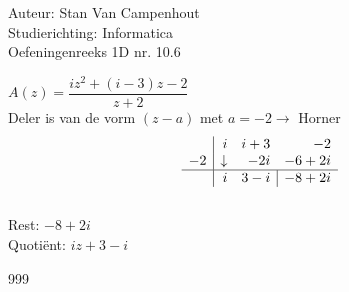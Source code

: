 \documentclass[a4paper]{article}
\begin{document}
  
\noindent \large Auteur: Stan Van Campenhout \\
\noindent \large Studierichting:  Informatica\\
\noindent \large Oefeningenreeks 1D nr. 10.6\\

\medskip

\normalsize

$ A(z) = \dfrac{iz^2 + (i-3)z - 2}{z + 2} $\\

Deler is van de vorm $(z - a)$ met $a = -2 \rightarrow$ Horner \\

 \[ \begin{array}{c|rrr}     
&i &i + 3 &-2  \\      
-2 & \downarrow  &-2i &-6 + 2i \\ \hline    
 &i &  \multicolumn{1}{c|}{3 - i}  &-8 + 2i
\end{array} \] \\

Rest: $ -8 + 2i $\\

Quotiënt: $iz + 3 - i $\\

\begin{thebibliography}{999}
\end{thebibliography}
\end{document}
